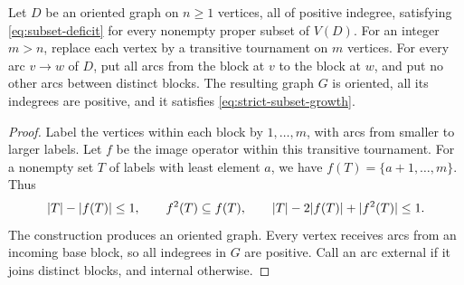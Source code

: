 \begin{lemma}
\label{lem:blowup}
Let $D$ be an oriented graph on $n\ge1$ vertices, all of positive
indegree, satisfying \eqref{eq:subset-deficit} for every nonempty proper
subset of $V(D)$.  For an integer $m>n$, replace each vertex by a
transitive tournament on $m$ vertices.  For every arc $v\to w$ of $D$,
put all arcs from the block at $v$ to the block at $w$, and put no other
arcs between distinct blocks.  The resulting graph $G$ is oriented,
all its indegrees are positive, and it satisfies
\eqref{eq:strict-subset-growth}.
\end{lemma}

\begin{proof}
Label the vertices within each block by $1,\ldots,m$, with arcs from
smaller to larger labels.  Let $f$ be the image operator within this
transitive tournament.  For a nonempty set $T$ of labels with least
element $a$, we have $f(T)=\{a+1,\ldots,m\}$.  Thus
\begin{equation}
\label{eq:internal-block-bound}
  \lvert T\rvert-\lvert f(T)\rvert\le1,\qquad
  f^2(T)\subseteq f(T),\qquad
  \lvert T\rvert-2\lvert f(T)\rvert+\lvert f^2(T)\rvert\le1.
\end{equation}
The construction produces an oriented graph.  Every vertex receives
arcs from an incoming base block, so all indegrees in $G$ are positive.
Call an arc external if it joins distinct blocks, and internal otherwise.


\end{proof}
